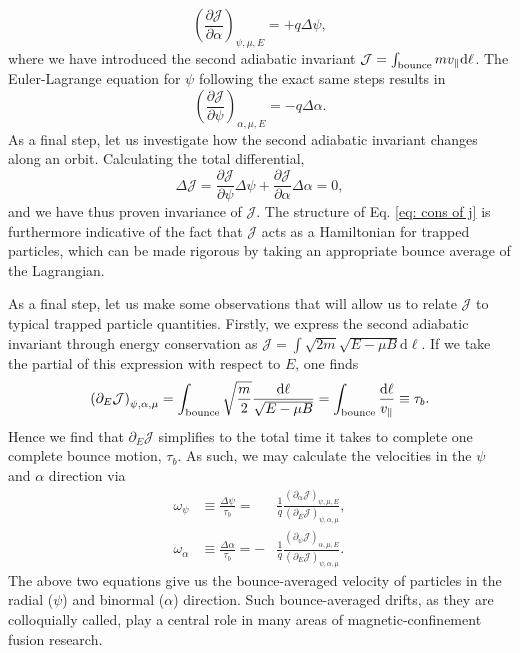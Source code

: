 \begin{equation}
    \left( \frac{\partial \mathcal{J}}{\partial \alpha} \right)_{\psi,\mu,E} = + q \Delta\psi,
    \label{eq: dJdalpha}
\end{equation}
where we have introduced the second adiabatic invariant $\mathcal{J} = \int_{\rm bounce} m v_\parallel \mathrm{d}\ell$. The Euler-Lagrange equation for $\psi$ following the exact same steps results in
\begin{equation}
    \left( \frac{\partial \mathcal{J}}{\partial \psi} \right)_{\alpha,\mu,E} = - q \Delta\alpha.
    \label{eq: dJdpsi}
\end{equation}
As a final step, let us investigate how the second adiabatic invariant changes along an orbit. Calculating the total differential,
\begin{equation}
    \Delta \mathcal{J} = \frac{\partial \mathcal{J}}{\partial \psi} \Delta \psi + \frac{\partial \mathcal{J}}{\partial \alpha} \Delta \alpha = 0,
    \label{eq: cons of j}
\end{equation}
and we have thus proven invariance of $\mathcal{J}$. The structure of Eq. \eqref{eq: cons of j} is furthermore indicative of the fact that $\mathcal{J}$ acts as a Hamiltonian for trapped particles, which can be made rigorous by taking an appropriate bounce average of the Lagrangian. \par 
As a final step, let us make some observations that will allow us to relate $\mathcal{J}$ to typical trapped particle quantities. Firstly, we express the second adiabatic invariant through energy conservation as $\mathcal{J} = \int \sqrt{2m} \sqrt{E - \mu B} \mathrm{d} \ell$. If we take the partial of this expression with respect to $E$, one finds
\begin{equation}
    \left(\partial_E \mathcal{J}\right)_{\psi,\alpha,\mu} = \int_{\rm bounce} \sqrt{\frac{m}{2}} \frac{\mathrm{d}\ell}{\sqrt{E - \mu B}} = \int_{\rm bounce} \frac{\mathrm{d} \ell}{v_\parallel} \equiv \tau_b.
\end{equation}
Hence we find that $\partial_E \mathcal{J}$ simplifies to the total time it takes to complete one complete bounce motion, $\tau_b$. As such, we may calculate the velocities in the $\psi$ and $\alpha$ direction via 
\begin{subequations}
\begin{alignat}{4}
\omega_\psi &\equiv \frac{\Delta \psi}{\tau_b} = &\frac{1}{q} \frac{\left( \partial_\alpha \mathcal{J} \right)_{\psi,\mu,E}}{\left(\partial_E \mathcal{J}\right)_{\psi,\alpha,\mu}}, \\
\omega_\alpha &\equiv \frac{\Delta \alpha}{\tau_b} = - &\frac{1}{q} \frac{\left( \partial_\psi \mathcal{J} \right)_{\alpha,\mu,E}}{\left(\partial_E \mathcal{J}\right)_{\psi,\alpha,\mu}}. \label{eq: omega_alpha}
\end{alignat}
\end{subequations}
The above two equations give us the bounce-averaged velocity of particles in the radial ($\psi$) and binormal ($\alpha$) direction. Such bounce-averaged drifts, as they are colloquially called, play a central role in many areas of magnetic-confinement fusion research.
